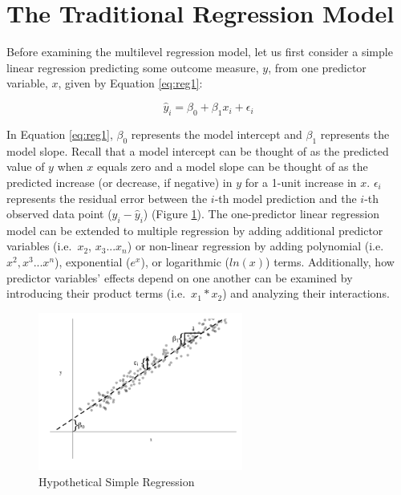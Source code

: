 \documentclass[
]{article}
\begin{document}
\hypertarget{the-traditional-regression-model}{%
\section{The Traditional Regression Model}\label{the-traditional-regression-model}}

Before examining the multilevel regression model, let us first consider a simple linear regression predicting some outcome measure, \(y\), from one predictor variable, \(x\), given by Equation \ref{eq:reg1}:

\begin{equation}
\hat{y}_{i}=\beta_{0}+\beta_{1}x_{i}+\epsilon_{i}
\label{eq:reg1}
\end{equation}

\noindent
In Equation \ref{eq:reg1}, \(\beta_{0}\) represents the model intercept and \(\beta_{1}\) represents the model slope. Recall that a model intercept can be thought of as the predicted value of \(y\) when \(x\) equals zero and a model slope can be thought of as the predicted increase (or decrease, if negative) in \(y\) for a 1-unit increase in \(x\). \(\epsilon_{i}\) represents the residual error between the \(i\)-th model prediction and the \(i\)-th observed data point (\(y_{i}-\hat{y}_{i}\)) (Figure \ref{fig1}). The one-predictor linear regression model can be extended to multiple regression by adding additional predictor variables (i.e.~\(x_{2}\), \(x_{3}...x_{n}\)) or non-linear regression by adding polynomial (i.e.~\(x^{2}, x^{3}...x^{n}\)), exponential (\(e^{x}\)), or logarithmic (\(ln(x)\)) terms. Additionally, how predictor variables' effects depend on one another can be examined by introducing their product terms (i.e.~\(x_{1}*x_{2}\)) and analyzing their interactions.

\begin{figure}[H]
\centering
\captionsetup{width=0.6\textwidth}
\includegraphics[width=0.6\textwidth]{fig1.png}
\caption{Hypothetical Simple Regression}
\label{fig1}
\end{figure}
\end{document}
